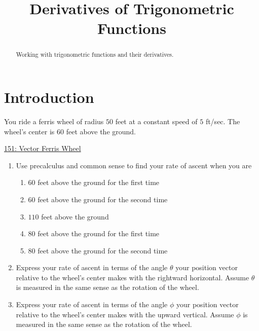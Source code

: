 \documentclass{ximera}
\title{Derivatives of Trigonometric Functions}
\begin{document}
\begin{abstract}
Working with trigonometric functions and their derivatives.
\end{abstract}
\maketitle



\section{Introduction}

\begin{question}  \label{QodfdfisOO}
You ride a ferris wheel of radius $50$ feet at a constant speed of $5$ ft/sec. The wheel's center is $60$ feet above the ground.


\begin{onlineOnly}
    \begin{center}
\end{center}
\end{onlineOnly}

\href{https://www.desmos.com/calculator/rlgxg2wbms}{151: Vector Ferris Wheel}

\begin{enumerate}
\item Use precalculus and common sense to find your rate of ascent when you are 

\begin{enumerate}
\item $60$ feet above the ground for the first time

\item $60$ feet above the ground for the second time

\item $110$ feet above the ground

\item $80$ feet above the ground for the first time

\item $80$ feet above the ground for the second time

\end{enumerate}

\item Express your rate of ascent in terms of the angle $\theta$ your position vector relative to the wheel's center makes with the rightward horizontal. Assume $\theta$ is measured in the same sense as the rotation of the wheel.

\item Express your rate of ascent in terms of the angle $\phi$ your position vector relative to the wheel's center makes with the upward vertical. Assume  $\phi$ is measured in the same sense as the rotation of the wheel.


\end{enumerate}




\end{question}
\end{document}
